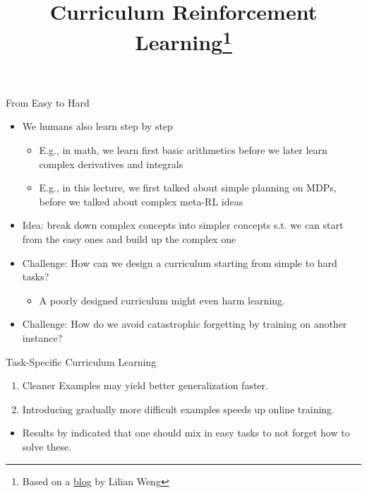 \documentclass[aspectratio=169]{../latex_main/tntbeamer}  %
\title[Curriculum RL]{Curriculum Reinforcement Learning\footnote{Based on a \href{https://lilianweng.github.io/lil-log/2020/01/29/curriculum-for-reinforcement-learning.html}{blog} by Lilian Weng}}
\begin{document}
	
	\maketitle

\begin{frame}[c]{From Easy to Hard}


\begin{itemize}
	\item We humans also learn step by step
	\begin{itemize}
		\item E.g., in math, we learn first basic arithmetics before we later learn complex derivatives and integrals
		\item E.g., in this lecture, we first talked about simple planning on MDPs, before we talked about complex meta-RL ideas
	\end{itemize}
	\smallskip
	\item \alert{Idea:} break down complex concepts into simpler concepts s.t. we can start from the easy ones and build up the complex one
	\item \alert{Challenge}: How can we design a curriculum starting from simple to hard tasks?
	\begin{itemize}
		\item A poorly designed curriculum might even harm learning.
	\end{itemize}
	\item \alert{Challenge}: How do we avoid catastrophic forgetting by training on another instance?
\end{itemize}


\end{frame}
\begin{frame}[c]{Task-Specific Curriculum Learning~}

	\begin{enumerate}
		\item Cleaner Examples may yield better generalization faster.
		\item Introducing gradually more difficult examples speeds up online training.
	\end{enumerate}

	\begin{itemize}
		\item Results by  indicated that one should mix in easy tasks to not forget how to solve these.
	\end{itemize}

	
\end{frame}
\end{document}
